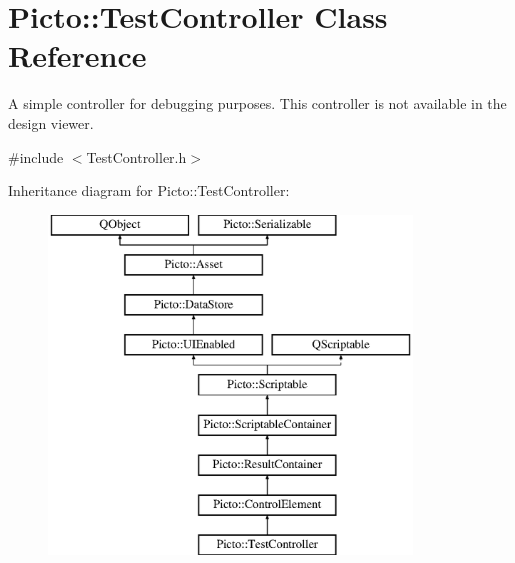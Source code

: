 \hypertarget{class_picto_1_1_test_controller}{\section{Picto\-:\-:Test\-Controller Class Reference}
\label{class_picto_1_1_test_controller}
}


A simple controller for debugging purposes. This controller is not available in the design viewer.  




{\ttfamily \#include $<$Test\-Controller.\-h$>$}

Inheritance diagram for Picto\-:\-:Test\-Controller\-:\begin{figure}[H]
\begin{center}
\leavevmode
\includegraphics[height=9.000000cm]{class_picto_1_1_test_controller}
\end{center}
\end{figure}

